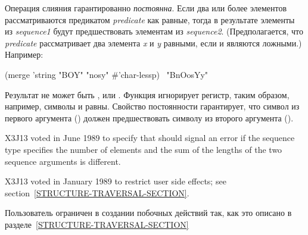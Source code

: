 \begin{defun}[Функция]
Операция слияния гарантированно \emph{постоянна}.
Если два или более элементов рассматриваются предикатом \emph{predicate} как
равные, тогда в результате элементы из \emph{sequence1} будут предшествовать
элементам из \emph{sequence2}.
(Предполагается, что \emph{predicate} рассматривает два элемента \emph{x} и
\emph{y} равными, если 
 и
 являются ложными.)
Например:
\begin{lisp}
(merge 'string "BOY" "nosy" \#'char-lessp) \EV\ "BnOosYy"
\end{lisp}
Результат не может быть ,  или .
Функция  игнорирует регистр, таким образом, например, символы  и
 равны. Свойство постоянности гарантирует, что символ из первого аргумента
() должен предшествовать символу из второго аргумента ().

\begin{newer}
X3J13 voted in June 1989  to specify that
 should signal an error if the sequence type specifies the number of
elements and the sum of the lengths of the two sequence arguments is
different.
\end{newer}

\begin{new}
X3J13 voted in January 1989
to restrict user side effects; see section~\ref{STRUCTURE-TRAVERSAL-SECTION}.
\end{new}

Пользователь ограничен в создании побочных действий так, как это описано в
разделе~\ref{STRUCTURE-TRAVERSAL-SECTION}
\end{defun}

\fi